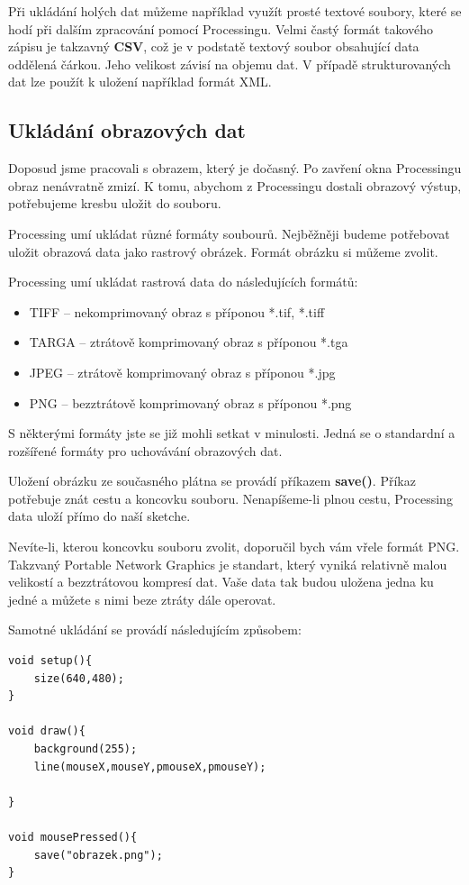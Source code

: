 \documentclass[10pt]{book}
\newcommand{\pododdil}[1]{\subsection{#1}\index{#1}\label{#1}}
\newcommand{\slovnik}[1]{\textbf{\gls{#1}}\index{#1}\label{#1}}
\begin{document}
Při ukládání holých dat můžeme například využít prosté textové soubory, které se hodí při dalším zpracování pomocí Processingu. Velmi častý formát takového zápisu je takzavný \slovnik{CSV}, což je v podstatě textový soubor obsahující data oddělená čárkou. Jeho velikost závisí na objemu dat. V případě strukturovaných dat lze použít k uložení například formát XML.


\pododdil{Ukládání obrazových dat}

Doposud jsme pracovali s obrazem, který je dočasný. Po zavření okna Processingu obraz nenávratně zmizí. K tomu, abychom z Processingu dostali obrazový výstup, potřebujeme kresbu uložit do souboru.

Processing umí ukládat různé formáty soubourů. Nejběžněji budeme potřebovat uložit obrazová data jako rastrový obrázek. Formát obrázku si můžeme zvolit.

Processing umí ukládat rastrová data do následujících formátů:


\begin{itemize}
\item
TIFF – nekomprimovaný obraz s příponou *.tif, *.tiff
\item
TARGA – ztrátově komprimovaný obraz s příponou *.tga
\item
JPEG – ztrátově komprimovaný obraz s příponou *.jpg
\item
PNG – bezztrátově komprimovaný obraz s příponou *.png

\end{itemize}

S některými formáty jste se již mohli setkat v minulosti. Jedná se o standardní a rozšířené formáty pro uchovávání obrazových dat.

Uložení obrázku ze současného plátna se provádí příkazem \slovnik{save()}. Příkaz potřebuje znát cestu a koncovku souboru. Nenapíšeme-li plnou cestu, Processing data uloží přímo do naší sketche.

Nevíte-li, kterou koncovku souboru zvolit, doporučil bych vám vřele formát PNG. Takzvaný Portable Network Graphics je standart, který vyniká relativně malou velikostí a bezztrátovou kompresí dat. Vaše data tak budou uložena jedna ku jedné a můžete s nimi beze ztráty dále operovat. 

Samotné ukládání se provádí následujícím způsobem:

\begin{lstlisting} 
void setup(){
	size(640,480);
}

void draw(){
	background(255);
	line(mouseX,mouseY,pmouseX,pmouseY);

}

void mousePressed(){
	save("obrazek.png");
}

\end{lstlisting}
\end{document}
